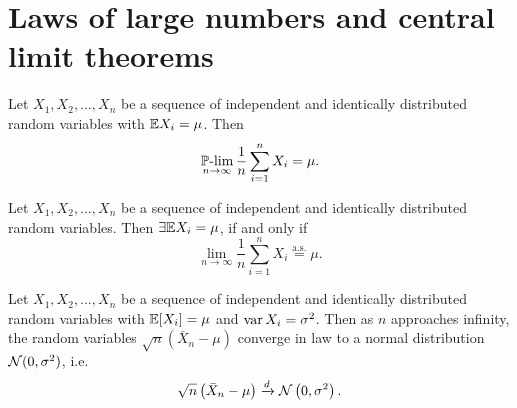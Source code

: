     \section{Laws of large numbers and central limit theorems}
        \begin{theorem}[Khinchin]
            Let $X_1, X_2, \dots, X_n$ be a sequence of independent and identically distributed 
            random variables with $\mathbb{E} X_i = \mu$. Then
            \begin{equation}
                \operatorname*{\operatorname{\mathbb{P}-lim}}_{n \to \infty} \frac{1}{n} \sum_{i=1}^n X_i = \mu.
            \end{equation}
        \end{theorem}
        \begin{theorem}[Kolmogorov]
            Let $X_1, X_2, \dots, X_n$ be a sequence of independent and identically distributed 
            random variables. Then $\exists \mathbb{E} X_i = \mu$, if and only if
            \begin{equation}
                \lim_{n \to \infty} \frac{1}{n} \sum_{i=1}^n X_i \overset{\text{a.s.}}{=} \mu.
            \end{equation}
        \end{theorem}

        \begin{theorem}
            Let $X_1, X_2, \dots, X_n$ be a sequence of independent and identically distributed random 
            variables with $\E[X_i] \hm{=} \mu$ and $\operatorname*{var} X_i = \sigma^2$. 
            Then as $n$ approaches infinity, the random variables $\sqrt{n}(\bar{X}_n - \mu)$ converge 
            in law to a normal distribution ${\cal N}(0, \sigma^2)$, i.e.
            \begin{equation}
                \sqrt{n}\left(\bar{X}_n - \mu\right) \xrightarrow{d} {\cal N}\left(0,\sigma^2\right).
            \end{equation}
        \end{theorem}


